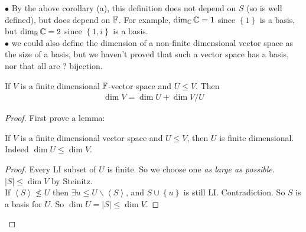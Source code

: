 \documentclass[a4paper]{article}
\begin{document}
\begin{rem}
$\bullet$ By the above corollary (a), this definition does not depend on $S$ (so is well defined), but does depend on $\mathbb{F}$. For example, $\dim_{\mathbb{C}} \mathbb{C} = 1 $ since $\left\{1\right\}$ is a basis, but $\dim_{\mathbb{R}} \mathbb{C} = 2$ since $\left\{1,i\right\}$ is a basis.\\
$\bullet$ we could also define the dimension of a non-finite dimensional vector space as the size of a basis, but we haven't proved that such a vector space has a basis, nor that all are ? bijection.
\end{rem}

\begin{prop}
If $V$ is a finite dimensional $\mathbb{F}$-vector space and $U \leq V$. Then
\begin{equation*}
\begin{aligned}
\dim V = \dim U + \dim V/U
\end{aligned}
\end{equation*}
\begin{proof}

First prove a lemma:
\begin{lemma}
If $V$ is a finite dimensional vector space and $U \leq V$, then $U$ is finite dimensional. Indeed $\dim U \leq \dim V$.
\begin{proof}
Every LI subset of $U$ is finite. So we choose one \emph{as large as possible}. $|S| \leq \dim V$ by Steinitz.\\
If $\left<S\right> \not \leq U$ then $\exists u \leq U \backslash \left<S\right>$, and $S \cup \left\{ u\right\}$ is still LI. Contradiction. So $S$ is a basis for $U$. So $\dim U = |S| \leq \dim V$.
\end{proof}
\end{lemma}


\end{proof}
\end{prop}
\end{document}
